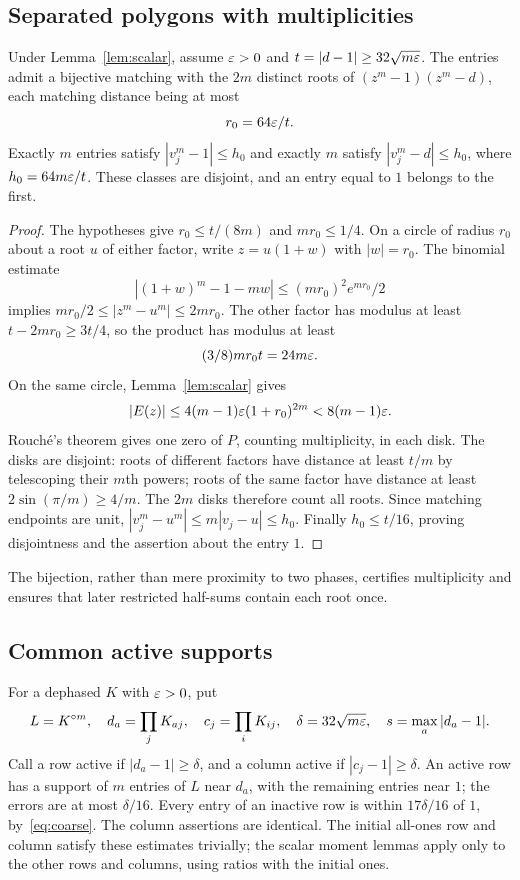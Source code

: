 \subsection{Separated polygons with multiplicities}
\begin{lemma}\label{lem:matching}
Under Lemma~\ref{lem:scalar}, assume $\varepsilon>0$ and $t=|d-1|\ge32\sqrt{m\varepsilon}$. The entries admit a bijective matching with the $2m$ distinct roots of $(z^m-1)(z^m-d)$, each matching distance being at most
\[
 r_0=64\varepsilon/t.
\]
Exactly $m$ entries satisfy $|v_j^m-1|\le h_0$ and exactly $m$ satisfy $|v_j^m-d|\le h_0$, where $h_0=64m\varepsilon/t$. These classes are disjoint, and an entry equal to $1$ belongs to the first.
\end{lemma}
\begin{proof}
The hypotheses give $r_0\le t/(8m)$ and $mr_0\le1/4$. On a circle of radius $r_0$ about a root $u$ of either factor, write $z=u(1+w)$ with $|w|=r_0$. The binomial estimate
\[
 |(1+w)^m-1-mw|\le (mr_0)^2e^{mr_0}/2
\]
implies $mr_0/2\le|z^m-u^m|\le2mr_0$. The other factor has modulus at least $t-2mr_0\ge3t/4$, so the product has modulus at least
\[
 (3/8)mr_0t=24m\varepsilon.
\]
On the same circle, Lemma~\ref{lem:scalar} gives
\[
 |E(z)|\le4(m-1)\varepsilon(1+r_0)^{2m}<8(m-1)\varepsilon.
\]
Rouch\'e's theorem gives one zero of $P$, counting multiplicity, in each disk. The disks are disjoint: roots of different factors have distance at least $t/m$ by telescoping their $m$th powers; roots of the same factor have distance at least $2\sin(\pi/m)\ge4/m$. The $2m$ disks therefore count all roots. Since matching endpoints are unit, $|v_j^m-u^m|\le m|v_j-u|\le h_0$. Finally $h_0\le t/16$, proving disjointness and the assertion about the entry $1$.
\end{proof}
The bijection, rather than mere proximity to two phases, certifies multiplicity and ensures that later restricted half-sums contain each root once.

\subsection{Common active supports}
For a dephased $K$ with $\varepsilon>0$, put
\begin{equation}\label{eq:active-defs}
 L=K^{\circ m},\quad d_a=\prod_jK_{aj},\quad c_j=\prod_iK_{ij},
 \quad\delta=32\sqrt{m\varepsilon},\quad s=\max_a|d_a-1|.
\end{equation}
Call a row active if $|d_a-1|\ge\delta$, and a column active if $|c_j-1|\ge\delta$. An active row has a support of $m$ entries of $L$ near $d_a$, with the remaining entries near $1$; the errors are at most $\delta/16$. Every entry of an inactive row is within $17\delta/16$ of $1$, by~\eqref{eq:coarse}. The column assertions are identical. The initial all-ones row and column satisfy these estimates trivially; the scalar moment lemmas apply only to the other rows and columns, using ratios with the initial ones.

